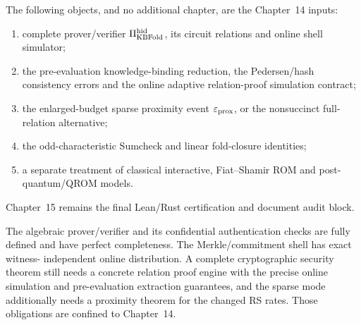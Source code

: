 \begin{definition}\label{def:full:handoff}
The following objects, and no
additional chapter, are the
Chapter~14 inputs:
\begin{enumerate}[label=\textup{(\roman*)}]
\item complete prover/verifier
$\Pi_{\rm KBFold}^{\rm hid}$,
its circuit relations and
online shell simulator;
\item the pre-evaluation
knowledge-binding reduction,
the Pedersen/hash consistency
errors and the online adaptive
relation-proof simulation contract;
\item the enlarged-budget sparse
proximity event
$\varepsilon_{\rm prox}$,
or the nonsuccinct
full-relation alternative;
\item the odd-characteristic
Sumcheck and linear fold-closure
identities;
\item a separate treatment of
classical interactive,
Fiat--Shamir ROM and
post-quantum/QROM models.
\end{enumerate}
Chapter~15 remains the
final Lean/Rust certification
and document audit block.
\end{definition}

\begin{remark}
The algebraic prover/verifier
and its confidential
authentication checks are
fully defined and have
perfect completeness.
The Merkle/commitment
shell has exact witness-
independent online distribution.
A complete cryptographic
security theorem still needs
a concrete relation proof
engine with the precise
online simulation and
pre-evaluation extraction
guarantees, and the
sparse mode additionally
needs a proximity theorem
for the changed RS rates.
Those obligations are
confined to Chapter~14.
\end{remark}
